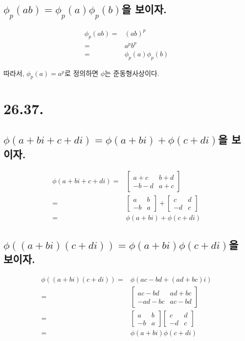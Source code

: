 \documentclass{article}
\begin{document}
\subsection{$\phi_p(ab)  = \phi_p(a) \phi_p(b)$을 보이자.}
\begin{align*}
\phi_p(ab) =& (ab)^p
\\ =& a^p b^p \tag{$R$은 가환환}
\\ =& \phi_p(a)  \phi_p(b)
\end{align*}

따라서, $\phi_p(a) = a^p$로 정의하면 $\phi$는 준동형사상이다.

\section{26.37.}
\subsection{$\phi(a+bi+c+di)  = \phi(a+bi) + \phi(c+di)$을 보이자.}
\begin{align*}
\phi(a+bi+c+di) =& \begin{bmatrix}
a+c& b+d \\ 
-b-d &a+c 
\end{bmatrix}
\\ =& \begin{bmatrix}
a& b \\ 
-b &a 
\end{bmatrix} + \begin{bmatrix}
c& d \\ 
-d &c 
\end{bmatrix}
\\ =& \phi(a+bi) + \phi(c+di)
\end{align*}
\subsection{$\phi((a+bi)(c+di))  = \phi(a+bi) \phi(c+di)$을 보이자.}
\begin{align*}
\phi((a+bi)(c+di)) =& \phi(ac-bd+(ad+bc)i)
\\ =& \begin{bmatrix}
ac-bd& ad+bc \\ 
-ad-bc &ac-bd
\end{bmatrix}
\\ =& \begin{bmatrix}
a& b \\ 
-b &a 
\end{bmatrix} \begin{bmatrix}
c& d \\ 
-d &c 
\end{bmatrix}
\\ =& \phi(a+bi)  \phi(c+di)
\end{align*}
\end{document}
